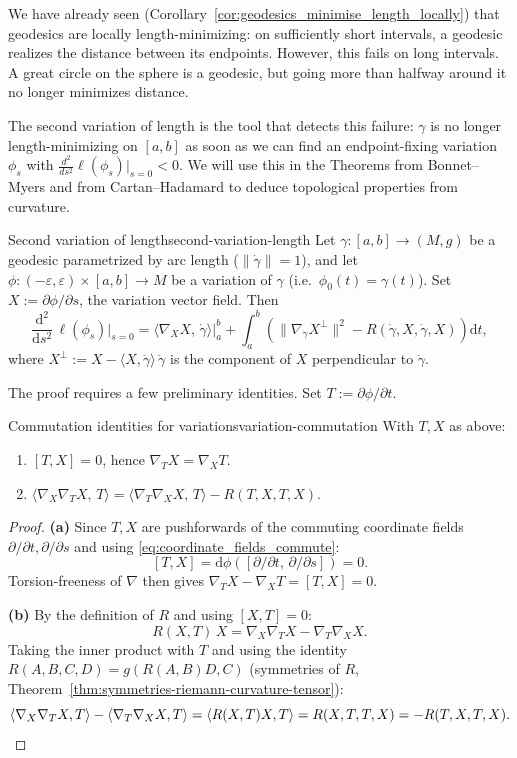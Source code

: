 We have already seen (Corollary~\ref{cor:geodesics_minimise_length_locally}) that geodesics are locally length-minimizing: on sufficiently short intervals, a geodesic realizes the distance between its endpoints. However, this fails on long intervals. A great circle on the sphere is a geodesic, but going more than halfway around it no longer minimizes distance.

The second variation of length is the tool that detects this failure: $\gamma$ is no longer length-minimizing on $[a, b]$ as soon as we can find an endpoint-fixing variation $\phi_s$ with $\frac{d^2}{ds^2}\ell(\phi_s)|_{s=0} < 0$. We will use this in the Theorems from Bonnet--Myers and from Cartan--Hadamard to deduce topological properties from curvature.

\begin{colortheo}{Second variation of length}{second-variation-length}
Let $\gamma \colon [a, b] \to (M, g)$ be a geodesic parametrized by arc length ($\|\dot\gamma\| = 1$), and let $\phi \colon (-\varepsilon, \varepsilon) \times [a, b] \to M$ be a variation of $\gamma$ (i.e.\ $\phi_0(t) = \gamma(t)$). Set $X := \partial\phi/\partial s$, the variation vector field. Then
\[
\frac{\mathrm{d}^2}{\mathrm{d}s^2}\,\ell(\phi_s)\bigg|_{s=0} = \langle \nabla_X X,\, \dot\gamma\rangle\bigg|_a^b + \int_a^b \!\left(\|\nabla_{\dot\gamma} X^\perp\|^2 - R(\dot\gamma, X, \dot\gamma, X)\right) \mathrm{d}t,
\]
where $X^\perp := X - \langle X, \dot\gamma\rangle\,\dot\gamma$ is the component of $X$ perpendicular to $\dot\gamma$.
\end{colortheo}

The proof requires a few preliminary identities. Set $T := \partial\phi/\partial t$.

\begin{colorlem}{Commutation identities for variations}{variation-commutation}
With $T, X$ as above:
\begin{enumerate}
    \item[(a)] $[T, X] = 0$, hence $\nabla_T X = \nabla_X T$.
    \item[(b)] $\langle \nabla_X \nabla_T X,\, T\rangle = \langle \nabla_T \nabla_X X,\, T\rangle - R(T, X, T, X)$.
\end{enumerate}
\end{colorlem}

\begin{proof}
\textbf{(a)} Since $T, X$ are pushforwards of the commuting coordinate fields $\partial/\partial t, \partial/\partial s$ and using \eqref{eq:coordinate_fields_commute}:
\[
[T, X] = \mathrm{d}\phi\!\left([\partial/\partial t,\, \partial/\partial s]\right) = 0.
\]
Torsion-freeness of $\nabla$ then gives $\nabla_T X - \nabla_X T = [T, X] = 0$.

\textbf{(b)} By the definition of $R$ and using $[X, T] = 0$:
\[
R(X, T)\, X = \nabla_X \nabla_T X - \nabla_T \nabla_X X.
\]
Taking the inner product with $T$ and using the identity $R(A, B, C, D) = g(R(A, B) D, C)$ (symmetries of $R$, Theorem~\ref{thm:symmetries-riemann-curvature-tensor}):
\[
\langle \nabla_X \nabla_T X, T\rangle - \langle \nabla_T \nabla_X X, T\rangle = \langle R(X, T) X, T\rangle = R(X, T, T, X) = -R(T, X, T, X). \qedhere
\]
\end{proof}

